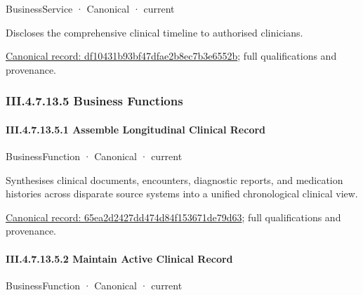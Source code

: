 \label{element:df10431b93bf47dfae2b8ec7b3e6552b}
{\small BusinessService · Canonical · current}\par

Discloses the comprehensive clinical timeline to authorised clinicians.


{\footnotesize \href{../../../../continuum/business/business-service/df10431b93bf47dfae2b8ec7b3e6552b.md}{Canonical record: df10431b93bf47dfae2b8ec7b3e6552b}; full qualifications and provenance.}\par
\subsubsection*{III.4.7.13.5 Business Functions}
\label{navigation:III.4.7.13.5}

\paragraph*{III.4.7.13.5.1 Assemble Longitudinal Clinical Record}
\label{navigation:III.4.7.13.5.1}

\label{element:65ea2d2427dd474d84f153671de79d63}
{\small BusinessFunction · Canonical · current}\par

Synthesises clinical documents, encounters, diagnostic reports, and medication histories across disparate source systems into a unified chronological clinical view.


{\footnotesize \href{../../../../continuum/business/business-function/65ea2d2427dd474d84f153671de79d63.md}{Canonical record: 65ea2d2427dd474d84f153671de79d63}; full qualifications and provenance.}\par
\paragraph*{III.4.7.13.5.2 Maintain Active Clinical Record}
\label{navigation:III.4.7.13.5.2}

\label{element:dbccf500cf4a44e0987f972311bab03a}
{\small BusinessFunction · Canonical · current}\par

